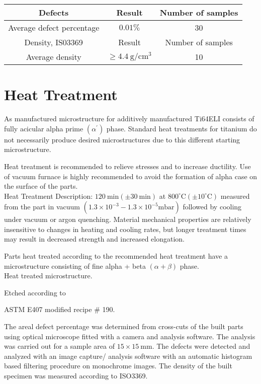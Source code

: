 \documentclass[10pt]{article}
\begin{document}
\begin{center}
\begin{tabular}{|c|c|c|}
\hline
Defects & Result & Number of samples \\
\hline
Average defect percentage & $0.01 \%$ & 30 \\
\hline
Density, IS03369 & Result & Number of samples \\
\hline
Average density & $\geq 4.4 \mathrm{~g} / \mathrm{cm}^{3}$ & 10 \\
\hline
\end{tabular}
\end{center}

\section*{Heat Treatment}
As manufactured microstructure for additively manufactured Ti64ELI consists of fully acicular alpha prime $\left(\alpha^{\prime}\right)$ phase. Standard heat treatments for titanium do not necessarily produce desired microstructures due to this different starting microstructure.

Heat treatment is recommended to relieve stresses and to increase ductility. Use of vacuum furnace is highly recommended to avoid the formation of alpha case on the surface of the parts.\\
Heat Treatment Description: $120 \mathrm{~min}( \pm 30 \mathrm{~min})$ at $800^{\circ} \mathrm{C}\left( \pm 10^{\circ} \mathrm{C}\right)$ measured from the part in vacuum $\left(1.3 \times 10^{-3}-1.3 \times 10^{-5} \mathrm{mbar}\right)$ followed by cooling under vacuum or argon quenching. Material mechanical properties are relatively insensitive to changes in heating and cooling rates, but longer treatment times may result in decreased strength and increased elongation.

Parts heat treated according to the recommended heat treatment have a microstructure consisting of fine alpha + beta $(\alpha+\beta)$ phase.\\
Heat treated microstructure.

Etched according to

ASTM E407 modified recipe \# 190.

The areal defect percentage was determined from cross-cuts of the built parts using optical microscope fitted with a camera and analysis software. The analysis was carried out for a sample area of $15 \times 15 \mathrm{~mm}$. The defects were detected and analyzed with an image capture/ analysis software with an automatic histogram based filtering procedure on monochrome images. The density of the built specimen was measured according to ISO3369.
\end{document}
